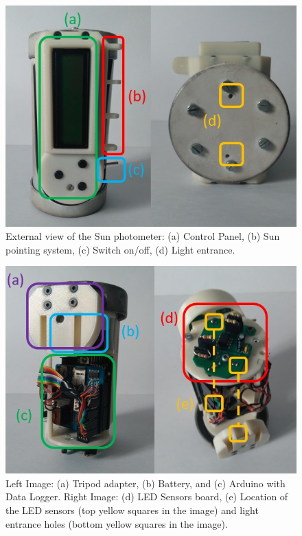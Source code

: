 \documentclass[12pt,letterpaper]{article}
\numberwithin{figure}{section}
\numberwithin{equation}{section}
\numberwithin{table}{section}
\begin{document}
\begin{figure}[!htb]
    \centering
    \includegraphics[scale=0.75]{Figuras/figure_1.jpg}
    \caption{External view of the Sun photometer: (a) Control Panel, (b) Sun pointing system, (c) Switch on/off, (d) Light entrance.}
    \label{fig:1}
\end{figure}

\begin{figure}[!htb]
    \centering
    \includegraphics[scale=0.75]{Figuras/figure_2.jpg}
    \caption{Left Image: (a) Tripod adapter, (b) Battery, and (c) Arduino with Data Logger. Right Image: (d) LED Sensors board, (e) Location of the LED sensors (top yellow squares in the image) and light entrance holes (bottom yellow squares in the image).}
    \label{fig:2}
\end{figure}
\end{document}
